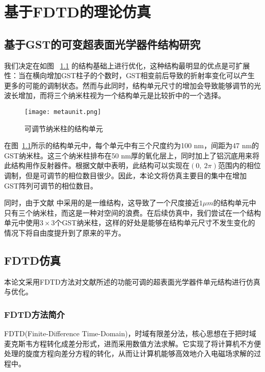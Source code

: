 \chapter{基于FDTD的理论仿真}
\label{cha:simulation}

\section{基于GST的可变超表面光学器件结构研究}
\label{sec:second}

我们决定在如图 ~\ref{fig:metaunit}  \cite{GSTnk} 的结构基础上进行优化，这种结构最明显的优点是可扩展性：当在横向增加GST柱子的个数时，GST相变前后导致的折射率变化可以产生更多的可能的调制状态。然而与此同时，结构单元尺寸的增加会导致能够调节的光波长增加，而将三个纳米柱视为一个结构单元是比较折中的一个选择。
\begin{figure}[H] %
  \centering
  \texttt{[image: metaunit.png]}
  \caption{可调节纳米柱的结构单元} \cite{GSTnk}
  \label{fig:metaunit}
\end{figure}

在图~\ref{fig:metaunit}所示的结构单元中，每个单元中有三个尺度约为100 nm，间距为47 nm的GST纳米柱。这三个纳米柱排布在50 nm厚的氧化层上，同时加上了铝沉底用来将此结构用作反射器件。根据文献中表明，此结构可以实现在$\left (0,\ 2\pi \right )$范围内的相位调制，但是可调节的相位数目很少。因此，本论文将仿真主要目的集中在增加GST阵列可调节的相位数目。

同时，由于文献 \cite{GSTnk} 中采用的是一维结构，这导致了一个尺度接近$1 \mu m$的结构单元中只有三个纳米柱，而这是一种对空间的浪费。在后续仿真中，我们尝试在一个结构单元中使用$3 \times 3$个GST纳米柱，这样的好处是能够在结构单元尺寸不发生变化的情况下将自由度提升到了原来的平方。

\section{FDTD仿真}
本论文采用FDTD方法对文献所述的功能可调的超表面光学器件单元结构进行仿真与优化。
\subsection{FDTD方法简介}
\label{subsec:fdtd}
FDTD(Finite-Difference Time-Domain)，时域有限差分法，核心思想在于把时域麦克斯韦方程转化成差分形式，进而采用数值方法求解。它实现了将计算机不方便处理的旋度方程向差分方程的转化，从而让计算机能够高效地介入电磁场求解的过程中。

